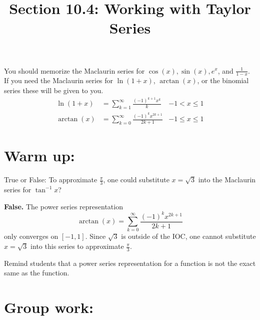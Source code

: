 \documentclass[handout]{ximera}
\title{Section 10.4: Working with Taylor Series}
\begin{document}
\begin{abstract}		\end{abstract}
\maketitle

You should memorize the Maclaurin series for $\cos(x), \sin(x), e^x$, and $\frac{1}{1-x}$.  If you need the Maclaurin series for $\ln(1+x)$, $\arctan(x)$, or the binomial series these will be given to you.
\begin{align*}
		\ln(1+x) &= \sum_{k=1}^\infty \frac{(-1)^{k+1} x^k}{k}  &-1 < x \leq 1 \\
		\arctan(x) &=\sum_{k=0}^\infty \frac{(-1)^k x^{2k+1}}{2k+1}   &-1 \leq x \leq 1
\end{align*}

\section{Warm up:}
True or False:  To approximate $\frac{\pi}{3}$, one could substitute $x = \sqrt{3}$ into the Maclaurin series for $\tan^{-1}x$?
	\begin{freeResponse}
	{\bf False.}  The power series representation 
		\[
		\arctan(x) = \sum_{k=0}^\infty \frac{(-1)^k x^{2k+1}}{2k+1} 
		\]
	only converges on $[-1,1]$.  
	Since $\sqrt{3}$ is outside of the IOC, one cannot substitute $x=\sqrt{3}$ into this series to approximate $\frac{\pi}{3}$.  
	\end{freeResponse}	
\begin{instructorNotes}
Remind students that a power series representation for a function is not the exact same as the function.
\end{instructorNotes}







\section{Group work:}
\end{document}
